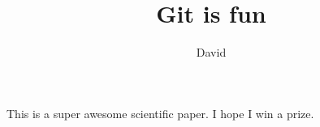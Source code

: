 \documentclass[10pt]{article}
\author{David}
\title{Git is fun}
\begin{document}
	\maketitle

	This is a super awesome scientific paper.
	I hope I win a prize.
\end{document}
